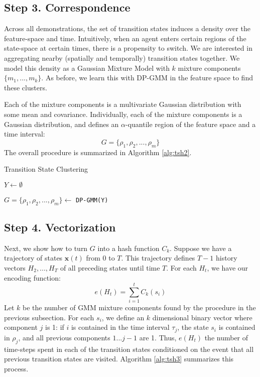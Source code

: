 \subsection{Step 3. Correspondence}
Across all demonstrations, the set of transition states induces a density over the feature-space and time.
Intuitively, when an agent enters certain regions of the state-space at certain times, there is a propensity to switch.
We are interested in aggregating nearby (spatially and temporally) transition states together.
We model this density as a Gaussian Mixture Model with $k$ mixture components $\{m_1,...,m_k\}$.
As before, we learn this with DP-GMM in the feature space to find these clusters.

Each of the mixture components is a multivariate Gaussian distribution with some mean and covariance.
Individually, each of the mixture components is a Gaussian distribution, and defines an $\alpha$-quantile region of the feature space and a time interval:
\[
G = \{\rho_1, \rho_2,...,\rho_m\}
\]
The overall procedure is summarized in Algorithm \ref{alg:tsh2}.

\begin{algorithm}[t]
\small
\DontPrintSemicolon
\caption{Transition State Clustering \label{alg:tsh2}}

$Y \leftarrow \emptyset$

$G = \{\rho_1, \rho_2,...,\rho_m\}\leftarrow$ \texttt{DP-GMM(Y)}

\end{algorithm}

\subsection{Step 4. Vectorization}
Next, we show how to turn $G$ into a hash function $C_k$.
Suppose we have a trajectory of states $\mathbf{x}(t)$ from 0 to $T$.
This trajectory defines $T-1$ history vectors $H_2,...,H_T$ of all preceding states until time $T$.
For each $H_t$, we have our encoding function:
\[
e(H_t) = \sum_{i=1}^t C_k(s_i)
\]
Let $k$ be the number of GMM mixture components found by the procedure in the previous subsection.
For each $s_i$, we define an $k$ dimensional binary vector where component $j$ is 1: if $i$ is contained in the time interval $\tau_j$, the state $s_i$ is contained in $\rho_j$, and all previous components $1...j-1$ are 1. 
Thus, $e(H_t)$ the number of time-steps spent in each of the transition states conditioned on the event that all previous transition states are visited.
Algorithm \ref{alg:tsh3} summarizes this process.

